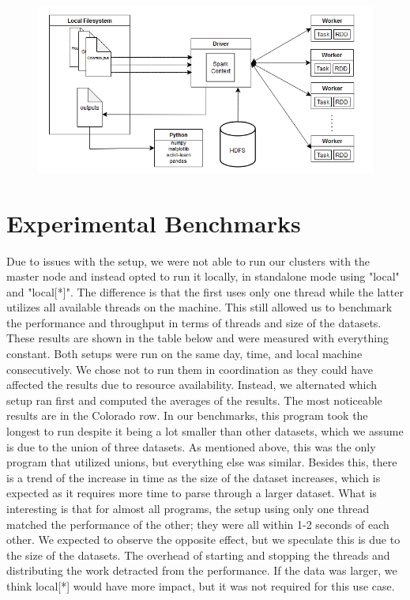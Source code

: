 \documentclass[titlepage]{article}
\begin{document}
\begin{figure}[h]
  \centering
  \includegraphics[width=\linewidth]{uml}
\end{figure}

\section{Experimental Benchmarks}
Due to issues with the setup, we were not able to run our clusters with the master node and instead opted to run it locally, in standalone mode using "local" and "local[*]". The difference is that the first uses only one thread while the latter utilizes all available threads on the machine. This still allowed us to benchmark the performance and throughput in terms of threads and size of the datasets. These results are shown in the table below and were measured with everything constant. Both setups were run on the same day, time, and local machine consecutively. We chose not to run them in coordination as they could have affected the results due to resource availability. Instead, we alternated which setup ran first and computed the averages of the results. The most noticeable results are in the Colorado row. In our benchmarks, this program took the longest to run despite it being a lot smaller than other datasets, which we assume is due to the union of three datasets. As mentioned above, this was the only program that utilized  unions, but everything else was similar. Besides this, there is a trend of the increase in time as the size of the dataset increases, which is expected as it requires more time to parse through a larger dataset. What is interesting is that for almost all programs, the setup using only one thread matched the performance of the other; they were all within 1-2 seconds of each other. We expected to observe the opposite effect, but we speculate this is due to the size of the datasets. The overhead of starting and stopping the threads and distributing the work detracted from the performance. If the data was larger, we think local[*] would have more impact, but it was not required for this use case.
\end{document}
